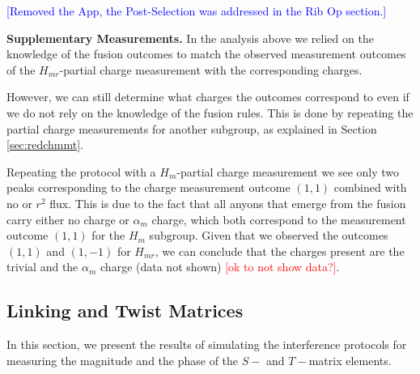 \documentclass[two column]{article}
\newcommand{\caro}[1]{\textcolor{red}{[#1]}}
\newcommand{\jovan}[1]{\textcolor{blue}{[#1]}}
\begin{document}
\jovan{Removed the App, the Post-Selection was addressed in the Rib Op section.}



\textbf{Supplementary Measurements.} In the analysis above we relied on the knowledge of the fusion outcomes to match the observed measurement outcomes of the $H_{mr}$-partial charge measurement with the corresponding charges. 

However, we can still determine what charges the outcomes correspond to even if we do not rely on the knowledge of the fusion rules. This is done by repeating the partial charge measurements for another subgroup, as explained in Section \ref{sec:redchmmt}.

Repeating the protocol with a $H_m$-partial charge measurement we see only two peaks corresponding to the charge measurement outcome $(1,1)$ combined with no or $r^2$ flux. This is due to the fact that all anyons that emerge from the fusion carry either no charge or $\alpha_m$ charge, which both correspond to the measurement outcome $(1,1)$ for the $H_m$ subgroup. Given that we observed the outcomes $(1,1)$ and $(1,-1)$ for $H_{mr}$, we can conclude that the charges present are the trivial and the $\alpha_m$ charge (data not shown) \caro{ok to not show data?}.







\subsection{Linking and Twist Matrices}\label{sec:num:intef}

In this section, we present the results of simulating the interference protocols for measuring the magnitude and the phase of the $S-$ and $T-$matrix elements. 
\end{document}
